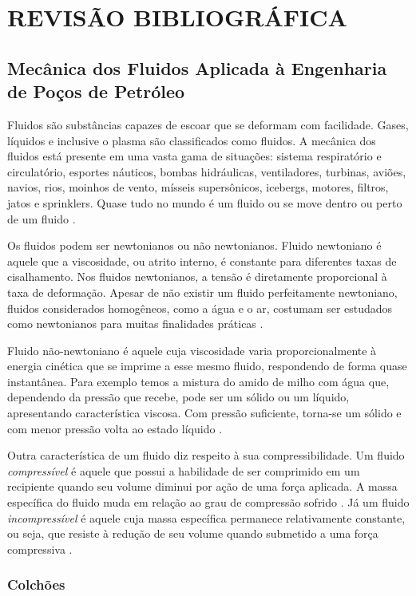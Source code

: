 \section{REVISÃO BIBLIOGRÁFICA}

\subsection{Mecânica dos Fluidos Aplicada à Engenharia de Poços de Petróleo}
	
Fluidos são substâncias capazes de escoar que se deformam com facilidade. Gases, líquidos e inclusive o plasma são classificados como fluidos. A mecânica dos fluidos está presente em uma vasta gama de situações: sistema respiratório e circulatório, esportes náuticos, bombas hidráulicas, ventiladores, turbinas, aviões, navios, rios, moinhos de vento, mísseis supersônicos, icebergs, motores, filtros, jatos e sprinklers. Quase tudo no mundo é um fluido ou se move dentro ou perto de um fluido \cite{White}. 
		
Os fluidos podem ser newtonianos ou não newtonianos. Fluido newtoniano é aquele que a viscosidade, ou atrito interno, é constante para diferentes taxas de cisalhamento. Nos fluidos newtonianos, a tensão é diretamente proporcional à taxa de deformação. Apesar de não existir um fluido perfeitamente newtoniano, fluidos considerados homogêneos, como a água e o ar, costumam ser estudados como newtonianos para muitas finalidades práticas \cite{Pordeus}.
		
		
Fluido não-newtoniano é aquele cuja viscosidade varia proporcionalmente à energia cinética que se imprime a esse mesmo fluido, respondendo de forma quase instantânea. Para exemplo temos a mistura do amido de milho com água que, dependendo da pressão que recebe, pode ser um sólido ou um líquido, apresentando característica viscosa. Com pressão suficiente, torna-se um sólido e com menor pressão volta ao estado líquido \cite{Pordeus}.
		
		
Outra característica de um fluido diz respeito à sua compressibilidade. Um fluido \emph{compressível} é aquele que possui a habilidade de ser comprimido em um recipiente quando seu volume diminui por ação de uma força aplicada. A massa específica do fluido muda em relação ao grau de compressão sofrido . Já um fluido \textit{incompressível} é aquele cuja massa específica permanece relativamente constante, ou seja, que resiste à redução de seu volume quando submetido a uma força compressiva \cite{Pordeus}.
		
\subsubsection{Colchões}

